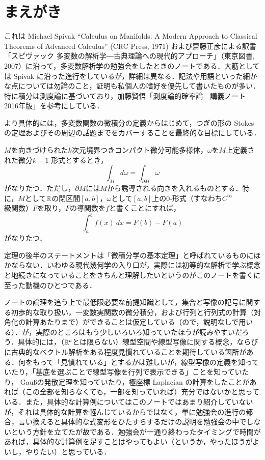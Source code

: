 \section*{まえがき}

これは Michael Spivak ``Calculus on Manifolds: A Modern Approach to Classical Theorems of Advanced Calculus'' (CRC Press, 1971) および齋藤正彦による訳書「スピヴァック 多変数の解析学―古典理論への現代的アプローチ」（東京図書, 2007）に沿って，多変数解析学の勉強会をしたときのノートである．大筋としては Spivak に沿った進行をしているが，詳細は異なる．記法や用語といった細かな点については勿論のこと，証明も私個人の嗜好を優先して書いたものが多い．特に積分は測度論に基づいており，加藤賢悟「測度論的確率論　講義ノート　2016年版」を参考にしている．

より具体的には，多変数関数の微積分の定義からはじめて，つぎの形の Stokes の定理およびその周辺の話題までをカバーすることを最終的な目標にしている．
\begin{thm*}
$M$を向きづけられた$k$次元境界つきコンパクト微分可能多様体，$\omega$を$M$上定義された微分$k-1$-形式とするとき，
\begin{equation}
\int_M d\omega = \int_{\partial M} \omega
\end{equation}がなりたつ．ただし，$\partial M$には$M$から誘導される向きを入れるものとする．特に，$M$として$\mathbb{R}$の閉区間$[a,b]$，$\omega$として$[a,b]$上の0-形式（すなわち$C^\infty$級関数）$F$を取り，$F$の導関数を$f$と書くことにすれば，
\begin{equation}
\int_a^b f(x)\ dx = F(b) - F(a)
\end{equation}がなりたつ．
\end{thm*}
定理の後半のステートメントは「微積分学の基本定理」と呼ばれているものにほかならない．いわゆる現代幾何学の入り口が，実際には初等的な解析で学ぶ概念と地続きになっていることをきちんと理解したいというのがこのノートを書くに至った動機のひとつである．

ノートの論理を追う上で最低限必要な前提知識として，集合と写像の記号に関する初歩的な取り扱い，一変数実関数の微分積分，および行列と行列式の計算（対角化の計算あたりまで）ができることは仮定している（ので，説明なしで用いる）．が，実際のところはもう少しいろいろ知っていたほうが読みやすいだろう．具体的には，（$\mathbb{R}^n$とは限らない）線型空間や線型写像に関する概念，ならびに古典的なベクトル解析をある程度見慣れていることを期待している箇所がある．何をもって「見慣れている」とするかは難しいが，線型写像の定義を知っていたり，「基底を選ぶことで線型写像を行列で表示できる」ことを知っていたり， Gau\ss の発散定理を知っていたり，極座標 Laplacian の計算をしたことがあれば（この全部を知らなくても，一部を知っていれば）充分ではないかと思っている．また，具体的な計算例についてはこのノートではあまり紹介していないが，それは具体的な計算を軽んじているからではなく，単に勉強会の進行の都合，言い換えると具体的な式変形をひたすらするだけの説明を勉強会の中でしないという方針を立てたが故である．勉強会が一通り終わったタイミングで時間があれば，具体的な計算例を足すことはやってもよい（というか，やったほうがよいし，やりたい）と思っている．

